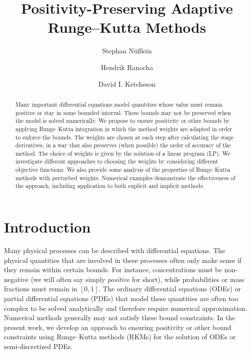 \documentclass[a4paper]{article}
\title{Positivity-Preserving Adaptive Runge--Kutta Methods}
\author{Stephan Nüßlein \and Hendrik Ranocha \and David I. Ketcheson}
\numberwithin{equation}{section}
\theoremstyle{plain}
\theoremstyle{definition}
\numberwithin{theorem}{section}
\newcommand{\1}{\mathbbm{1}}
\begin{document}
\maketitle

\begin{abstract}
Many important differential equations model quantities whose value
must remain positive or stay in some bounded interval.
These bounds may not be preserved when the model is solved numerically.
We propose to ensure positivity or other bounds by applying Runge--Kutta
integration in which the method weights are adapted in order to
enforce the bounds.  The weights are chosen at each step after calculating the
stage derivatives, in a way that also preserves (when possible) the order of
accuracy of the method.  The choice of weights is given by the solution
of a linear program (LP).
We investigate different approaches to choosing the weights by considering
different objective functions.  We also provide some analysis of the properties
of Runge--Kutta methods with perturbed weights.  Numerical examples demonstrate
the effectiveness of the approach, including application to both explicit and
implicit methods.
\end{abstract}



\section{Introduction}


Many physical processes can be described with differential equations. 
The physical quantities that are involved in these processes often only make sense if they remain within certain bounds.
For instance, concentrations must be non-negative (we will often say simply {\em positive} for short), while
probabilities or mass fractions must remain in $[0,1]$.
The ordinary differential equations (ODEs) or partial differential equations
(PDEs) that model these quantities are often too complex to be solved
analytically and therefore require numerical approximation.
Numerical methods generally may not satisfy these bound constraints.
In the present work, we develop an approach to ensuring positivity
or other bound constraints using Runge--Kutta methods (RKMs) for the
solution of ODEs or semi-discretized PDEs.
\end{document}
